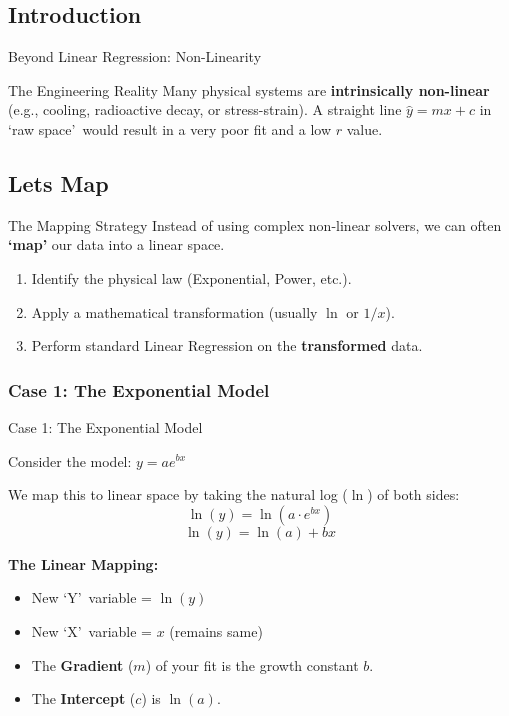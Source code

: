 \subsection{Introduction}
\begin{frame}{Beyond Linear Regression: Non-Linearity}
    \begin{block}{The Engineering Reality}
        Many physical systems are \textbf{intrinsically non-linear} (e.g., cooling, radioactive decay, or stress-strain). A straight line $\hat{y} = mx + c$ in \lq raw space\rq\ would result in a very poor fit and a low $r$ value.
    \end{block}
\subsection{Lets Map}
    \begin{block}{The Mapping Strategy}
        Instead of using complex non-linear solvers, we can often \textbf{\lq map\rq} our data into a linear space. 
        \begin{enumerate}
            \item Identify the physical law (Exponential, Power, etc.).
            \item Apply a mathematical transformation (usually $\ln$ or $1/x$).
            \item Perform standard Linear Regression on the \textbf{transformed} data.
        \end{enumerate}
    \end{block}
\end{frame}

\subsubsection{Case 1: The Exponential Model}
\begin{frame}{Case 1: The Exponential Model}
    \begin{example}
        Consider the model: $y = ae^{bx}$
    \end{example}

    \begin{solution}
        We map this to linear space by taking the natural log ($\ln$) of both sides:
        $$\ln(y) = \ln(a \cdot e^{bx})$$
        $$\ln(y) = \ln(a) + bx$$
        
        \textbf{The Linear Mapping:}
        \begin{itemize}
            \item New \lq Y\rq\ variable = $\ln(y)$
            \item New \lq X\rq\ variable = $x$ (remains same)
            \item The \textbf{Gradient} ($m$) of your fit is the growth constant $b$.
            \item The \textbf{Intercept} ($c$) is $\ln(a)$.
        \end{itemize}
    \end{solution}
\end{frame}

